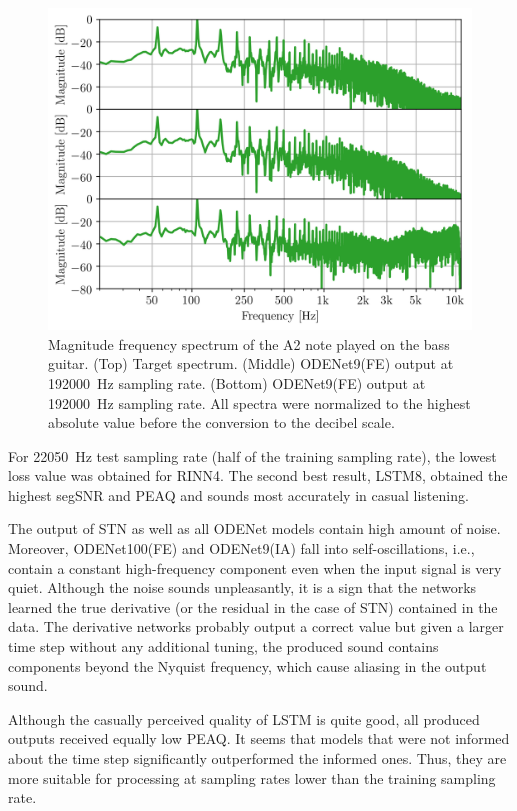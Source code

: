 \begin{figure}
    \centering
    \includegraphics{figures/tikz/diode_clipper_aliasing/diode_clipper_aliasing.tex.png}
    \caption{Magnitude frequency spectrum of the A2 note played on the bass guitar. (Top) Target spectrum. (Middle) ODENet9(FE) output at \SI{192000}{Hz} sampling rate. (Bottom) ODENet9(FE) output at \SI{192000}{Hz} sampling rate. All spectra were normalized to the highest absolute value before the conversion to the decibel scale.}
    \label{fig:diode_clipper_aliasing}
\end{figure}

For \SI{22050}{Hz} test sampling rate (half of the training sampling rate), the lowest loss value was obtained for \ac{RINN}4. The second best result, \ac{LSTM}8, obtained the highest \ac{segSNR} and \ac{PEAQ} and sounds most accurately in casual listening. 

The output of \ac{STN} as well as all ODENet models contain high amount of noise. Moreover, ODENet100(FE) and ODENet9(IA) fall into self-oscillations, i.e., contain a constant high-frequency component even when the input signal is very quiet. Although the noise sounds unpleasantly, it is a sign that the networks learned the true derivative (or the residual in the case of \ac{STN}) contained in the data. The derivative networks probably output a correct value but given a larger time step without any additional tuning, the produced sound contains components beyond the Nyquist frequency, which cause aliasing in the output sound. 

Although the casually perceived quality of \ac{LSTM} is quite good, all produced outputs received equally low \ac{PEAQ}. It seems that models that were not informed about the time step significantly outperformed the informed ones. Thus, they are more suitable for processing at sampling rates lower than the training sampling rate.

